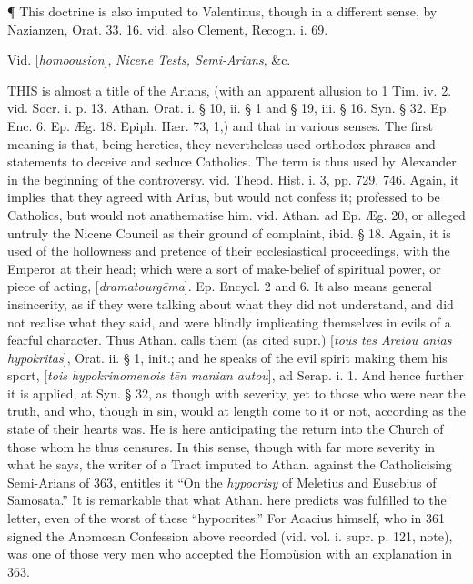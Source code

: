 ¶ This doctrine is also imputed to Valentinus,
though in a different sense, by Nazianzen, Orat. 33. 16. vid. also
Clement, Recogn. i. 69.


Vid. [\emph{homoousion}], \emph{Nicene
Tests,
Semi-Arians}, \&c.


THIS
is almost a title of the Arians, (with an apparent allusion to 1 Tim.
iv. 2. vid. Socr. i. p. 13. Athan. Orat. i. § 10, ii. § 1 and § 19,
iii. § 16. Syn. § 32. Ep. Enc. 6. Ep. Æg. 18. Epiph. Hær. 73, 1,)
and that in various senses. The first meaning is that, being heretics,
they nevertheless used orthodox phrases and statements to deceive and
seduce Catholics. The term is thus used by Alexander in the beginning
of the controversy. vid. Theod. Hist. i. 3, pp. 729, 746. Again, it
implies that they agreed with Arius, but would not confess it;
professed to be Catholics, but would not anathematise him. vid. Athan.
ad Ep. Æg. 20, or alleged untruly the Nicene Council as their ground
of complaint, ibid. § 18. Again, it is used of the hollowness and
pretence of their ecclesiastical proceedings, with the Emperor at
their head; which were a sort of make-belief of spiritual power, or
piece of acting, [\emph{dramatourg\={e}ma}]. Ep. Encycl. 2 and 6.
It also means general insincerity, as if they were talking about what
they did not understand, and did not realise what they said, and were
blindly implicating themselves in evils of a fearful character. Thus
Athan. calls them (as cited supr.) [\emph{tous t\={e}s Areiou anias
hypokritas}], Orat. ii. § 1, init.; and he speaks of the evil
spirit making them his sport, [\emph{tois hypokrinomenois t\={e}n
manian autou}], ad Serap. i. 1. And hence further it is
applied, at Syn. § 32, as though with severity, yet to those who were
near the truth, and who, though in sin, would at length come to it or
not, according as the state of their hearts was. He is here
anticipating the return into the Church of those whom he thus
censures. In this sense, though with far more severity in what he
says, the writer of a Tract imputed to Athan. against the
Catholicising Semi-Arians of 363, entitles it ``On the \emph{hypocrisy}
of Meletius and Eusebius of Samosata.'' It is remarkable that what
Athan. here predicts was fulfilled to the letter, even of the worst of
these ``hypocrites.'' For Acacius himself, who in 361 signed the
Anomœan Confession above recorded (vid. vol. i. supr. p. 121, note),
was one of those very men who accepted the Homoüsion with an
explanation in 363.


